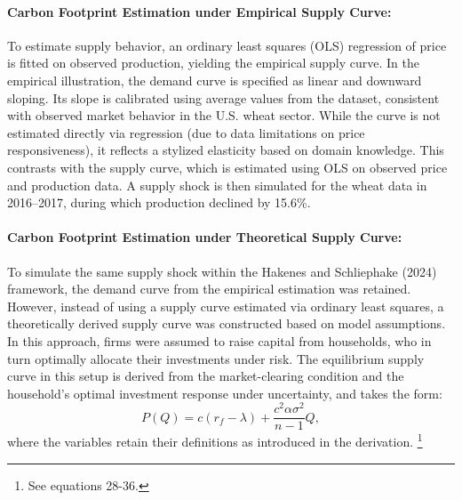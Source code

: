 \documentclass[12pt,a4paper]{article}%
\begin{document}
\paragraph{Carbon Footprint Estimation under Empirical Supply Curve:}
To estimate supply behavior, an ordinary least squares (OLS) regression of price is fitted on observed production, yielding the empirical supply curve. In the empirical illustration, the demand curve is specified as linear and downward sloping. Its slope is calibrated using average values from the dataset, consistent with observed market behavior in the U.S. wheat sector. While the curve is not estimated directly via regression (due to data limitations on price responsiveness), it reflects a stylized elasticity based on domain knowledge. This contrasts with the supply curve, which is estimated using OLS on observed price and production data. A supply shock is then simulated for the wheat data in 2016–2017, during which production declined by 15.6\%. 


\paragraph{Carbon Footprint Estimation under Theoretical Supply Curve:}To simulate the same supply shock within the Hakenes and Schliephake (2024) framework, the demand curve from the empirical estimation was retained. However, instead of using a supply curve estimated via ordinary least squares, a theoretically derived supply curve was constructed based on model assumptions. In this approach, firms were assumed to raise capital from households, who in turn optimally allocate their investments under risk. The equilibrium supply curve in this setup is derived from the market-clearing condition and the household's optimal investment response under uncertainty, and takes the form:
\[
P(Q) = c(r_f - \lambda) + \frac{c^2 \alpha \sigma^2}{n - 1} Q,
\]
where the variables retain their definitions as introduced in the derivation. \footnote{See equations 28-36.}
\end{document}
